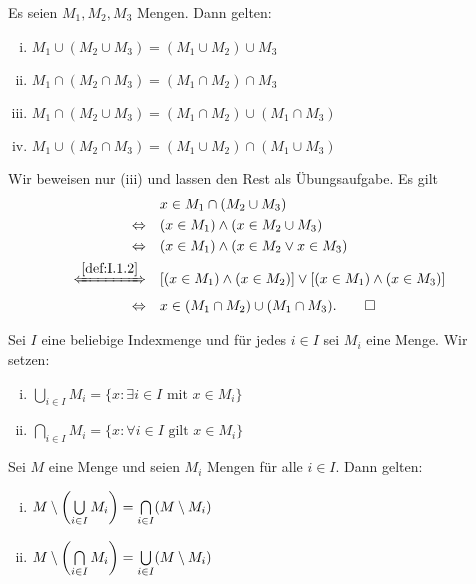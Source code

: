 \begin{satz}
	\label{satz:I.2.6}
	Es seien $M_1, M_2, M_3$ Mengen.
	Dann gelten:
	\begin{enumerate}[(i)]
		\item $M_1 \cup (M_2 \cup M_3) = (M_1 \cup M_2) \cup M_3$
		\item $M_1 \cap (M_2 \cap M_3) = (M_1 \cap M_2) \cap M_3$
		\item $M_1 \cap (M_2 \cup M_3) = (M_1 \cap M_2) \cup (M_1 \cap M_3)$
		\item $M_1 \cup (M_2 \cap M_3) = (M_1 \cup M_2) \cap (M_1 \cup M_3)$
	\end{enumerate}
\end{satz}

\begin{beweis}
	Wir beweisen nur (iii) und lassen den Rest als Übungsaufgabe.
	Es gilt
	\begin{align*}
		&x \in M_1 \cap (M_2 \cup M_3) \\
		\Leftrightarrow \quad &(x \in M_1) \wedge (x \in M_2 \cup M_3) \\
		\Leftrightarrow \quad &(x \in M_1) \wedge (x \in M_2 \vee x \in M_3) \\
		\xLeftrightarrow{\ref{def:I.1.2}} \quad &[(x \in M_1) \wedge (x \in M_2)] \vee [(x \in M_1) \wedge (x \in M_3)] \\
		\Leftrightarrow \quad &x \in (M_1 \cap M_2) \cup (M_1 \cap M_3). \qedhere
	\end{align*}
\end{beweis}

\begin{definition}
	\label{def:I.2.7}
	Sei $I$ eine beliebige Indexmenge und für jedes $i \in I$ sei $M_i$ eine Menge.
	Wir setzen:
	\begin{enumerate}[(i)]
		\item $\bigcup\limits_{i \in I} M_i = \{x : \exists i \in I \text{ mit } x \in M_i\}$
		\item $\bigcap\limits_{i \in I} M_i = \{x : \forall i \in I \text{ gilt } x \in M_i\}$
	\end{enumerate}
\end{definition}
\newpage
\begin{satz}
	\label{satz:I.2.8}
	Sei $M$ eine Menge und seien $M_i$ Mengen für alle $i \in I$.
	Dann gelten: 
	\begin{enumerate}[(i)]
		\item $M \setminus \left(\bigcup\limits_{i\in I} M_i\right) = \bigcap\limits_{i \in I} (M \setminus M_i)$
		\item $M \setminus \left(\bigcap\limits_{i\in I} M_i\right) = \bigcup\limits_{i \in I} (M \setminus M_i)$
	\end{enumerate}
\end{satz}

